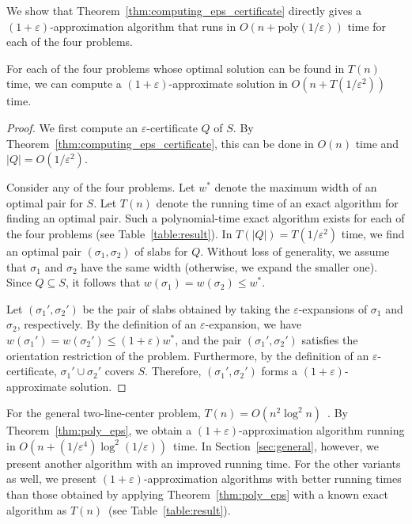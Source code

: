 \documentclass[english,a4paper, cleveref, autoref, thm-restate, nolineno]{socg-lipics-v2021}
\theoremstyle{star}
\theoremstyle{claimstar}
\newcommand{\eps}{\ensuremath{\varepsilon}}
\begin{document}

We show that Theorem~\ref{thm:computing_eps_certificate} directly gives a $(1+\eps)$-approximation algorithm that runs in $O(n + \mathrm{poly}(1/\eps))$ time for each of the four problems. 


\begin{theorem}
    \label{thm:poly_eps}
    For each of the four problems whose optimal solution can be found in $T(n)$ time, 
    we can compute a $(1+\eps)$-approximate solution in $O(n + T(1/\eps^2))$ time.
\end{theorem}

\begin{proof}
    
We first compute an $\eps$-certificate $Q$ of $S$. 
By Theorem~\ref{thm:computing_eps_certificate}, this can be done in $O(n)$ time and $|Q| = O(1/\eps^2)$.

Consider any of the four problems.
Let $w^*$ denote the maximum width of an optimal pair for $S$.  
Let $T(n)$ denote the running time of an exact algorithm for finding an optimal pair.
Such a polynomial-time exact algorithm exists for each of the four problems (see Table~\ref{table:result}).  
In $T(|Q|) = T(1/\eps^2)$ time, we find an optimal pair $(\sigma_1, \sigma_2)$ of slabs for $Q$.  
Without loss of generality, we assume that $\sigma_1$ and $\sigma_2$ have the same width (otherwise, we expand the smaller one).  
Since $Q \subseteq S$, it follows that $w(\sigma_1) = w(\sigma_2) \le w^*$.

Let $(\sigma_1', \sigma_2')$ be the pair of slabs obtained by taking the $\eps$-expansions of $\sigma_1$ and $\sigma_2$, respectively.  
By the definition of an $\eps$-expansion, we have $w(\sigma_1') = w(\sigma_2') \le (1+\eps)w^*$, and the pair $(\sigma_1', \sigma_2')$ satisfies the orientation restriction of the problem.  
Furthermore, by the definition of an $\eps$-certificate, $\sigma_1' \cup \sigma_2'$ covers $S$.  
Therefore, $(\sigma_1', \sigma_2')$ forms a $(1+\eps)$-approximate solution.
\end{proof}


For the general two-line-center problem, 
$T(n) = O(n^2 \log^2 n)$~\cite{jaromczyk1995}.
By Theorem~\ref{thm:poly_eps}, we obtain a $(1+\eps)$-approximation algorithm running in 
$O(n + (1/\eps^4) \log^2 (1/\eps))$~time. 
In Section~\ref{sec:general}, however, we present another algorithm with an improved running time. 
For the other variants as well, we present $(1+\eps)$-approximation algorithms with better running times than those obtained by applying Theorem~\ref{thm:poly_eps} with a known exact algorithm as $T(n)$~(see Table~\ref{table:result}).
\end{document}
